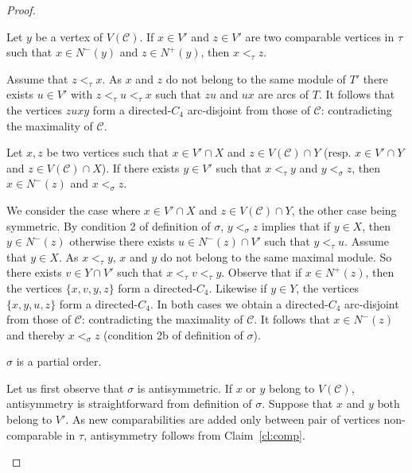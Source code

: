 \begin{proof}
\begin{claim} \label{cl:consec}
Let $y$ be a vertex of $V(\mathcal{C})$. If $x\in V'$ and $z\in V'$ are two comparable vertices in $\tau$ such that $x\in N^-(y)$ and $z\in N^+(y)$, then $x<_{\tau} z$.
\end{claim}
\begin{proofclaim}
Assume that $z<_{\tau} x$. As $x$ and $z$ do not belong to the same module of $T'$ there exists $u\in V'$ with $z<_{\tau} u<_{\tau} x$ such that $zu$ and $ux$ are arcs of $T$. It follows that the vertices $zuxy$ form a directed-$C_4$ arc-disjoint from those of $\mathcal{C}$: contradicting the maximality of $\mathcal{C}$.
\end{proofclaim}

\begin{claim} \label{cl:transitive}
Let $x,z$ be two vertices such that $x\in V'\cap X$ and $z\in V(\mathcal{C})\cap Y$ (resp. $x\in V'\cap Y$ and $z\in V(\mathcal{C})\cap X$). If there exists $y\in V'$ such that $x<_{\tau} y$ and $y<_{\sigma} z$, then $x\in N^-(z)$ and $x<_{\sigma} z$.
\end{claim}
\begin{proofclaim}
We consider the case where $x \in V' \cap X$ and $z \in V(\mathcal{C}) \cap Y$, the other case being symmetric.
By condition 2 of definition of $\sigma$, $y<_{\sigma} z$ implies that if $y\in X$, then $y\in N^-(z)$ otherwise there exists $u\in N^-(z)\cap V'$ such that $y<_{\tau} u$. Assume that $y\in X$. As $x<_{\tau} y$, $x$ and $y$ do not belong to the same maximal module. So there exists $v\in Y\cap V'$ such that $x<_{\tau} v<_{\tau} y$. Observe that if $x\in N^+(z)$, then the vertices $\{x,v,y,z\}$ form a directed-$C_4$. Likewise if $y\in Y$, the vertices $\{x,y,u,z\}$ form a directed-$C_4$. In both cases we obtain a directed-$C_4$ arc-disjoint from those of $\mathcal{C}$: contradicting the maximality of $\mathcal{C}$. It follows that $x\in N^-(z)$ and thereby $x<_{\sigma} z$ (condition 2b of definition of $\sigma$).
\end{proofclaim}


\begin{claim} \label{cl:PO}
$\sigma$ is a partial order. 
\end{claim}
\begin{proofclaim}
Let us first observe that $\sigma$ is antisymmetric. If $x$ or $y$ belong to $V(\mathcal{C})$, antisymmetry is straightforward from definition of $\sigma$. Suppose that $x$ and $y$ both belong to $V'$. As new comparabilities are added only between pair of vertices non-comparable in $\tau$, antisymmetry follows from Claim~\ref{cl:comp}. 


\end{proofclaim}
\end{proof}
